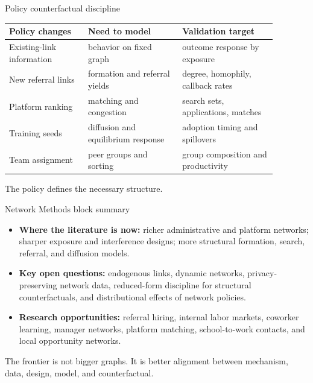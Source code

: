 \documentclass[aspectratio=169,11pt]{beamer}
\newcommand{\1}{\mathbf{1}}
\begin{document}
\begin{frame}{Policy counterfactual discipline}
\small
\begin{tabular}{p{0.26\linewidth} p{0.31\linewidth} p{0.31\linewidth}}
\toprule
Policy changes & Need to model & Validation target \\
\midrule
Existing-link information & behavior on fixed graph & outcome response by exposure \\
New referral links & formation and referral yields & degree, homophily, callback rates \\
Platform ranking & matching and congestion & search sets, applications, matches \\
Training seeds & diffusion and equilibrium response & adoption timing and spillovers \\
Team assignment & peer groups and sorting & group composition and productivity \\
\bottomrule
\end{tabular}

\medskip
The policy defines the necessary structure.
\end{frame}

\begin{frame}{Network Methods block summary}
\small
\begin{itemize}
    \item \textbf{Where the literature is now:} richer administrative and platform networks; sharper exposure and interference designs; more structural formation, search, referral, and diffusion models.
    \item \textbf{Key open questions:} endogenous links, dynamic networks, privacy-preserving network data, reduced-form discipline for structural counterfactuals, and distributional effects of network policies.
    \item \textbf{Research opportunities:} referral hiring, internal labor markets, coworker learning, manager networks, platform matching, school-to-work contacts, and local opportunity networks.
\end{itemize}

\medskip
The frontier is not bigger graphs. It is better alignment between mechanism, data, design, model, and counterfactual.
\end{frame}
\end{document}
